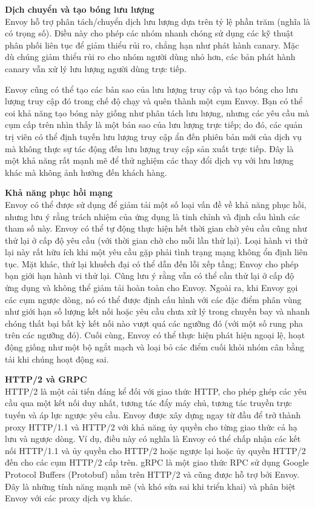 \documentclass[14pt,a4paper]{book}
\begin{document}
		\textbf{Dịch chuyển và tạo bóng lưu lượng}\\
		Envoy hỗ trợ phân tách/chuyển dịch lưu lượng dựa trên tỷ lệ phần trăm (nghĩa là có trọng số). Điều này cho phép các nhóm nhanh chóng sử dụng các kỹ thuật phân phối liên tục để giảm thiểu rủi ro, chẳng hạn như phát hành canary. Mặc dù chúng giảm thiểu rủi ro cho nhóm người dùng nhỏ hơn, các bản phát hành canary vẫn xử lý lưu lượng người dùng trực tiếp.
		
		Envoy cũng có thể tạo các bản sao của lưu lượng truy cập và tạo bóng cho lưu lượng truy cập đó trong chế độ chạy và quên thành một cụm Envoy. Bạn có thể coi khả năng tạo bóng này giống như phân tách lưu lượng, nhưng các yêu cầu mà cụm cấp trên nhìn thấy là một bản sao của lưu lượng trực tiếp; do đó, các quản trị viên có thể định tuyến lưu lượng truy cập ẩn đến phiên bản mới của dịch vụ mà không thực sự tác động đến lưu lượng truy cập sản xuất trực tiếp. Đây là một khả năng rất mạnh mẽ để thử nghiệm các thay đổi dịch vụ với lưu lượng khác mà không ảnh hưởng đến khách hàng.
		
		\textbf{Khả năng phục hồi mạng}\\
		Envoy có thể được sử dụng để giảm tải một số loại vấn đề về khả năng phục hồi, nhưng lưu ý rằng trách nhiệm của ứng dụng là tinh chỉnh và định cấu hình các tham số này. Envoy có thể tự động thực hiện hết thời gian chờ yêu cầu cũng như thử lại ở cấp độ yêu cầu (với thời gian chờ cho mỗi lần thử lại). Loại hành vi thử lại này rất hữu ích khi một yêu cầu gặp phải tình trạng mạng không ổn định liên tục. Mặt khác, thử lại khuếch đại có thể dẫn đến lỗi xếp tầng; Envoy cho phép bạn giới hạn hành vi thử lại. Cũng lưu ý rằng vẫn có thể cần thử lại ở cấp độ ứng dụng và không thể giảm tải hoàn toàn cho Envoy. Ngoài ra, khi Envoy gọi các cụm ngược dòng, nó có thể được định cấu hình với các đặc điểm phân vùng như giới hạn số lượng kết nối hoặc yêu cầu chưa xử lý trong chuyến bay và nhanh chóng thất bại bất kỳ kết nối nào vượt quá các ngưỡng đó (với một số rung pha trên các ngưỡng đó). Cuối cùng, Envoy có thể thực hiện phát hiện ngoại lệ, hoạt động giống như một bộ ngắt mạch và loại bỏ các điểm cuối khỏi nhóm cân bằng tải khi chúng hoạt động sai.
		
		\textbf{HTTP/2 và GRPC}\\
		HTTP/2 là một cải tiến đáng kể đối với giao thức HTTP, cho phép ghép các yêu cầu qua một kết nối duy nhất, tương tác đẩy máy chủ, tương tác truyền trực tuyến và áp lực ngược yêu cầu. Envoy được xây dựng ngay từ đầu để trở thành proxy HTTP/1.1 và HTTP/2 với khả năng ủy quyền cho từng giao thức cả hạ lưu và ngược dòng. Ví dụ, điều này có nghĩa là Envoy có thể chấp nhận các kết nối HTTP/1.1 và ủy quyền cho HTTP/2 hoặc ngược lại hoặc ủy quyền HTTP/2 đến cho các cụm HTTP/2 cấp trên. gRPC là một giao thức RPC sử dụng Google Protocol Buffers (Protobuf) nằm trên HTTP/2 và cũng được hỗ trợ bởi Envoy. Đây là những tính năng mạnh mẽ (và khó sửa sai khi triển khai) và phân biệt Envoy với các proxy dịch vụ khác.
		
\end{document}
